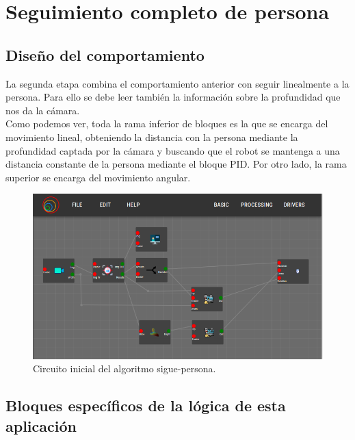 \section{Seguimiento completo de persona}
\label{sec:FP_2}

\subsection{Diseño del comportamiento}
\label{subsec:FP2_dis_comp}

La segunda etapa combina el comportamiento anterior con seguir linealmente a la persona. Para ello se debe leer también la información
sobre la profundidad que nos da la cámara.\\

Como podemos ver, toda la rama inferior de bloques es la que se encarga del movimiento lineal, obteniendo la distancia con la persona mediante
la profundidad captada por la cámara y buscando que el robot se mantenga a una distancia constante de la persona mediante el bloque PID.
Por otro lado, la rama superior se encarga del movimiento angular.

\begin{figure} [H]
    \begin{center}
        \includegraphics[width=12cm]{figs/c5/follow_person_final_model.png}
    \end{center}
    \caption[Circuito sigue-personas inicial]{Circuito inicial del algoritmo sigue-persona.}
    \label{fig:final_follow_person}
\end{figure}

\subsection{Bloques específicos de la lógica de esta aplicación}
\label{subsec:FP2_blocks}

